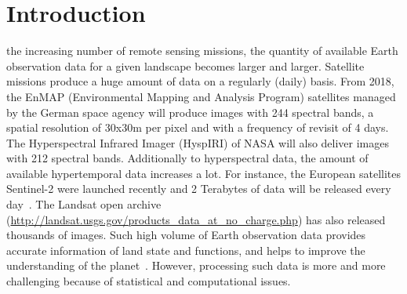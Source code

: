 \documentclass[journal,10pt]{IEEEtran}
\begin{document}

%
\IEEEpeerreviewmaketitle

\section{Introduction}
\label{sec:intro}

 the increasing number of remote sensing missions, the quantity of available Earth observation data for a given landscape becomes larger and larger. Satellite missions produce a huge amount of data on a regularly (daily) basis. From 2018, the EnMAP (Environmental Mapping and Analysis Program) satellites managed by the German space agency will produce images with 244 spectral bands, a spatial resolution of 30x30m per pixel and with a frequency of revisit of 4 days\cite{Müller09enmap}. The Hyperspectral Infrared Imager (HyspIRI) of NASA will also deliver images with 212 spectral bands. Additionally to hyperspectral data, the amount of available hypertemporal data increases a lot. For instance, the European satellites Sentinel-2 were launched recently and 2 Terabytes of data will be released every day~\cite{drusch2012sentinel}. The Landsat open archive (\url{http://landsat.usgs.gov/products_data_at_no_charge.php}) has also released thousands of images. Such high volume of Earth observation data provides accurate information of land state and functions, and helps to improve the understanding of the planet~\cite{rs1010001}. However, processing such data is more and more challenging because of statistical and computational issues.
\end{document}
